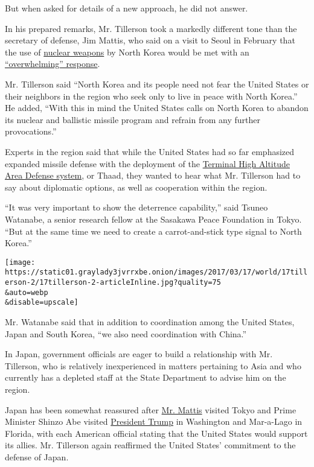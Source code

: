 But when asked for details of a new approach, he did not answer.

In his prepared remarks, Mr. Tillerson took a markedly different tone
than the secretary of defense, Jim Mattis, who said on a visit to Seoul
in February that the use of
\href{http://topics.nytimes3xbfgragh.onion/top/news/science/topics/atomic_weapons/index.html?inline=nyt-classifier}{nuclear
weapons} by North Korea would be met with an
\href{https://www.nytimes3xbfgragh.onion/2017/02/05/us/politics/jim-mattis-south-korea-japan.html}{``overwhelming''
response}.

Mr. Tillerson said ``North Korea and its people need not fear the United
States or their neighbors in the region who seek only to live in peace
with North Korea.'' He added, ``With this in mind the United States
calls on North Korea to abandon its nuclear and ballistic missile
program and refrain from any further provocations.''

Experts in the region said that while the United States had so far
emphasized expanded missile defense with the deployment of the
\href{http://www.lockheedmartin.com/us/products/thaad.html}{Terminal
High Altitude Area Defense system}, or Thaad, they wanted to hear what
Mr. Tillerson had to say about diplomatic options, as well as
cooperation within the region.

``It was very important to show the deterrence capability,'' said Tsuneo
Watanabe, a senior research fellow at the Sasakawa Peace Foundation in
Tokyo. ``But at the same time we need to create a carrot-and-stick type
signal to North Korea.''

\texttt{[image: https://static01.graylady3jvrrxbe.onion/images/2017/03/17/world/17tillerson-2/17tillerson-2-articleInline.jpg?quality=75\\\&auto=webp\\\&disable=upscale]}

Mr. Watanabe said that in addition to coordination among the United
States, Japan and South Korea, ``we also need coordination with China.''

In Japan, government officials are eager to build a relationship with
Mr. Tillerson, who is relatively inexperienced in matters pertaining to
Asia and who currently has a depleted staff at the State Department to
advise him on the region.

Japan has been somewhat reassured after
\href{https://www.nytimes3xbfgragh.onion/2017/02/04/world/asia/jim-mattis-defense-iran-persian-gulf.html}{Mr.
Mattis} visited Tokyo and Prime Minister Shinzo Abe visited
\href{https://www.nytimes3xbfgragh.onion/2017/02/13/world/asia/trump-japan-shinzo-abe.html}{President
Trump} in Washington and Mar-a-Lago in Florida, with each American
official stating that the United States would support its allies. Mr.
Tillerson again reaffirmed the United States' commitment to the defense
of Japan.

